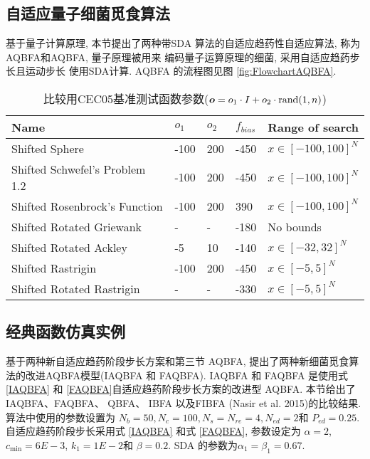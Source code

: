 \subsection{自适应量子细菌觅食算法}
基于量子计算原理, 本节提出了两种带SDA 算法的自适应趋药性自适应算法, 称为 AQBFA和AQBFA, 量子原理被用来 编码量子运算原理的细菌, 采用自适应趋药步长且运动步长 使用SDA计算.
AQBFA 的流程图见图 \ref{fig:FlowchartAQBFA}.
\begin{table}[tb]
\begin{center}
\caption{比较用CEC05基准测试函数参数($\bm o=o_1 \cdot I+o_2\cdot \textup{rand}(1,n)$)}
    \vspace{0.5em}\centering
\begin{tabularx}{0.9\textwidth}{p{6.0cm} p{1.05cm}p{0.75cm}p{1.05cm}p{4.2cm}}
\hline
Name &  $o_1$&  $o_2$&   $f_{bias}$& Range of search\\
\hline
Shifted Sphere &  -100&  200&  -450 &  $x\in [-100,100]^N$\\
Shifted Schwefel's Problem 1.2 &  -100&  200&  -450 &   $x\in [-100,100]^N$\\
Shifted Rosenbrock's Function &  -100&  200&  390 &   $x\in [-100,100]^N$\\
Shifted Rotated Griewank &  -&  -&  -180 &  No bounds\\
Shifted Rotated Ackley&  -5&  10&  -140 &  $x\in [-32,32]^N$\\
Shifted Rastrigin &  -100&  200&  -450 &  $x\in [-5,5]^N$\\
Shifted Rotated  Rastrigin&  -&  -&  -330 &  $x\in [-5,5]^N$\\
\hline
\end{tabularx}
\label{Tab:CEC05ofbias}
\end{center}
\vspace{-0.4cm}
\end{table}
\subsection{经典函数仿真实例}
基于两种新自适应趋药阶段步长方案和第三节 AQBFA, 提出了两种新细菌觅食算法的改进AQBFA模型(IAQBFA 和 FAQBFA). IAQBFA 和 FAQBFA 是使用式 \eqref{IAQBFA} 和 \eqref{FAQBFA}自适应趋药阶段步长方案的改进型 AQBFA. 本节给出了 IAQBFA、FAQBFA、 QBFA、 IBFA 以及FIBFA (Nasir et al. 2015)的比较结果. 算法中使用的参数设置为 $N_b=50, N_c=100, N_s=N_{re}=4, N_{ed}=2$和 $P_{ed}=0.25$. 自适应趋药阶段步长采用式 \eqref{IAQBFA} 和式 \eqref{FAQBFA}, 参数设定为 $\alpha=2$, $c_{\min}=6E-3$, $k_1=1E-2$和 $\beta=0.2$. SDA 的参数为$\alpha_1=\beta_1=0.67$.
